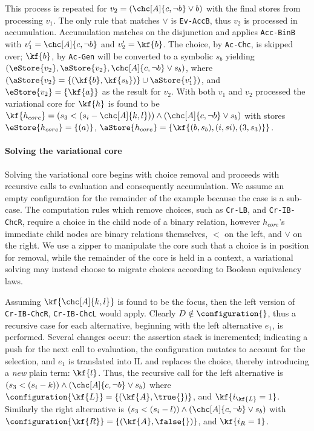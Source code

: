 This process is repeated for $v_{2} = (\chc[A]{c,\neg b} \vee b)$ with the final
stores from processing $v_{1}$. The only rule that matches $\vee$ is
\texttt{Ev-AccB}, thus $v_{2}$ is processed in accumulation. Accumulation
matches on the disjunction and applies \texttt{Acc-BinB} with $v_{1}' =
\chc[A]{c,\neg b}$ and $v_{2}' = \kf{b}$. The choice, by \texttt{Ac-Chc}, is
skipped over; $\kf{b}$, by \texttt{Ac-Gen} will be converted to a symbolic
$s_{b}$ yielding $(\eStore{v_{2}}, \aStore{v_{2}}, \chc[A]{c,\neg b} \vee
s_{b})$, where $(\aStore{v_{2}} = \{(\kf{b}, \kf{s_{b}})\} \cup
\aStore{v_{1}'})$, and $\eStore{v_{2}} = \{\kf{a}\}$ as the result for $v_{2}$.
With both $v_{1}$ and $v_{2}$ processed the variational core for $\kf{h}$ is
found to be $\kf{h_{core}} = (s_{3} < (s_{i} - \chc[A]{k,l})) \wedge
(\chc[A]{c,\neg b} \vee s_{b})$ with stores $\eStore{h_{core}} = \{(a)\}$,
$\aStore{h_{core}} = \{\kf{(b,s_{b}), (i,s{i}), (3,s_{3})}\}$.%

\paragraph{Solving the variational core}
Solving the variational core begins with choice removal and proceeds with
recursive calls to evaluation and consequently accumulation. We assume an empty
configuration for the remainder of the example because the \vc{} case is a
sub-case. The computation rules which remove choices, such as \texttt{Cr-LB},
and \texttt{Cr-IB-ChcR}, require a choice in the child node of a binary
relation, however $h_{core}$'s immediate child nodes are binary relations
themselves, $<$ on the left, and $\vee{}$ on the right. We use a zipper to
manipulate the core such that a choice is in position for removal, while the
remainder of the core is held in a context, a variational \sat{} solving may
instead choose to migrate choices according to Boolean equivalency laws.

Assuming $\kf{\chc[A]{k,l}}$ is found to be the focus, then the left version of
\texttt{Cr-IB-ChcR}, \texttt{Cr-IB-ChcL} would apply. Clearly $D \notin
\configuration{}$, thus a recursive case for each alternative, beginning with
the left alternative $e_{1}$, is performed. Several changes occur: the assertion
stack is incremented; indicating a push for the next call to evaluation, the
configuration mutates to account for the selection, and $e_{1}$ is translated
into IL and replaces the choice, thereby introducing a \textit{new} plain term:
$\kf{l}$. Thus, the recursive call for the left alternative is $(s_{3} < (s_{i}
- k)) \wedge (\chc[A]{c,\neg b} \vee s_{b})$ where $\configuration{\kf{L}} =
\{(\kf{A}, \true{})\}$, and $\kf{i_{\kf{L}} = 1}$. Similarly the right
alternative is $(s_{3} < (s_{i} - l)) \wedge (\chc[A]{c,\neg b} \vee s_{b})$
with $\configuration{\kf{R}} = \{(\kf{A}, \false{})\}$, and $\kf{i_{R} = 1}$.

